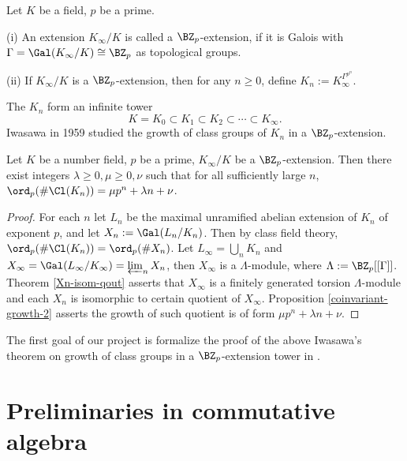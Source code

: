 \begin{definition}
\label{Zp-ext-def}
\leanok
Let $K$ be a field, $p$ be a prime.

{\rm(i)} An extension $K_\infty/K$ is called a $\BZ_p$-extension,
if it is Galois with $\Gamma=\Gal(K_\infty/K)\cong\BZ_p$
as topological groups.

{\rm(ii)} If $K_\infty/K$ is a $\BZ_p$-extension, then for any
$n\geq 0$, define $K_n:=K_\infty^{\Gamma^{p^n}}$.
\end{definition}

The $K_n$ form an infinite tower
$$
K=K_0\subset K_1\subset K_2\subset\cdots\subset K_\infty.
$$
Iwasawa in 1959 \cite{Iwa59}
studied the growth of class groups of $K_n$ in a $\BZ_p$-extension.

\begin{thm}
\label{clgp-growth}
\leanok
Let $K$ be a number field, $p$ be a prime,
$K_\infty/K$ be a $\BZ_p$-extension.
Then there exist integers $\lambda\geq 0,\mu\geq 0,\nu$
such that for all sufficiently large $n$,
$\ord_p(\#\Cl(K_n))=\mu p^n+\lambda n+\nu$.
\end{thm}

\begin{proof}
For each $n$ let $L_n$ be the maximal unramified abelian extension of $K_n$
of exponent $p$, and let $X_n:=\Gal(L_n/K_n)$.
Then by class field theory, $\ord_p(\#\Cl(K_n))=\ord_p(\# X_n)$.
Let $L_\infty=\bigcup_n K_n$ and $X_\infty=\Gal(L_\infty/K_\infty)=\varprojlim_n X_n$,
then $X_\infty$ is a $\Lambda$-module, where $\Lambda:=\BZ_p[[\Gamma]]$.
Theorem \ref{Xn-isom-qout} asserts that $X_\infty$ is a finitely generated
torsion $\Lambda$-module and each $X_n$ is isomorphic to certain quotient of $X_\infty$.
Proposition \ref{coinvariant-growth-2} asserts the growth of such quotient
is of form $\mu p^n+\lambda n+\nu$.
\end{proof}

The first goal of our project is formalize the proof of the above
Iwasawa's theorem on growth of class groups in a $\BZ_p$-extension tower
in {\Lean}.

\section{Preliminaries in commutative algebra}

